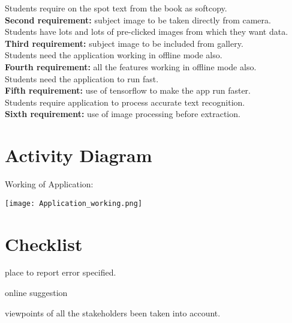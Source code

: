 \documentclass[18 pt]{article}
\begin{document}
\begin{Large}
Students require on the spot text from the book as softcopy.\\
\textbf{Second requirement:} subject image to be taken directly from camera.\\

Students have lots and lots of pre-clicked images from which they want data.\\
\textbf{Third requirement:} subject image to be included from gallery.\\

Students need the application working in offline mode also.\\
\textbf{Fourth requirement:} all the features working in offline mode also.\\

Students need the application to run fast.\\
\textbf{Fifth requirement:} use of tensorflow to make the app run faster.\\

Students require application to process accurate text recognition.\\
\textbf{Sixth requirement:} use of image processing before extraction.\\

\section{Activity Diagram}
Working of Application:
\begin{center}
\texttt{[image: Application\_working.png]}
\end{center}

\section{Checklist}

\begin{flushleft}

\makebox[0pt][l]{$\square$}\raisebox{.15ex}{\hspace{0.1em}$\checkmark$}
place to report error specified.

\makebox[0pt][l]{$\square$}\raisebox{.15ex}{\hspace{0.1em}$\checkmark$}
online suggestion 


\makebox[0pt][l]{$\square$}\raisebox{.15ex}{\hspace{0.1em}$\checkmark$}
viewpoints of all the stakeholders been taken into account.


\end{flushleft}
\end{Large}
\end{document}
